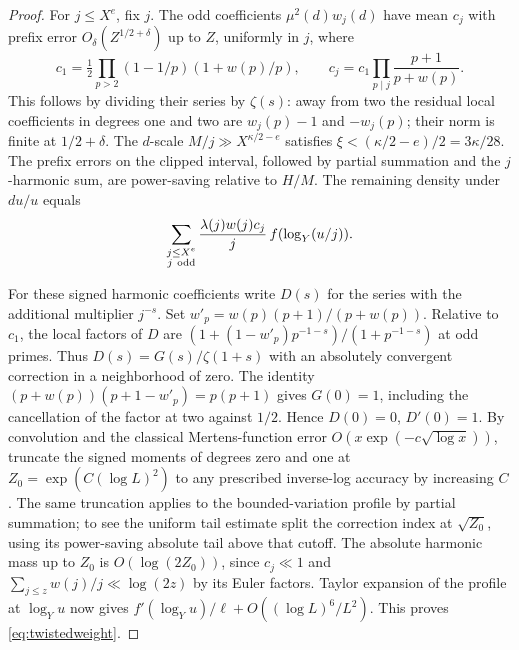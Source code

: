 \documentclass[11pt]{article}
\theoremstyle{remark}\newtheorem{remark}[theorem]{Remark}
\begin{document}
\begin{proof}
For \(j\le X^e\), fix \(j\). The odd coefficients
\(\mu^2(d)w_j(d)\) have mean \(c_j\) with prefix error
\(O_\delta(Z^{1/2+\delta})\) up to \(Z\), uniformly in \(j\), where
\[
 c_1=\tfrac12\prod_{p>2}(1-1/p)(1+w(p)/p),\qquad
 c_j=c_1\prod_{p\mid j}\frac{p+1}{p+w(p)}.
\]
This follows by dividing their series by \(\zeta(s)\):
away from two the residual local coefficients in degrees one and two
are \(w_j(p)-1\) and \(-w_j(p)\); their norm is finite at
\(1/2+\delta\). The \(d\)-scale \(M/j\gg X^{\kappa/2-e}\) satisfies
\(\xi<(\kappa/2-e)/2=3\kappa/28\). The prefix errors on the clipped
interval, followed by partial summation and the \(j\)-harmonic sum, are
power-saving relative to \(H/M\). The remaining density under \(du/u\) equals
\[
 \sum_{\substack{j\le X^e\\ j\ {\rm odd}}}
    \frac{\lambda(j)w(j)c_j}{j}\,f(\log_Y(u/j)).
\]

For these signed harmonic coefficients write \(D(s)\) for the series
with the additional multiplier \(j^{-s}\). Set \(w'_p=w(p)(p+1)/(p+w(p))\).
Relative to \(c_1\), the local factors of \(D\) are
\((1+(1-w'_p)p^{-1-s})/(1+p^{-1-s})\) at odd primes. Thus
\(D(s)=G(s)/\zeta(1+s)\) with an absolutely convergent correction
in a neighborhood of zero. The identity
\((p+w(p))(p+1-w'_p)=p(p+1)\) gives \(G(0)=1\), including the
cancellation of the factor at two against \(1/2\).
Hence \(D(0)=0\), \(D'(0)=1\).
By convolution and the classical Mertens-function error
\(O(x\exp(-c\sqrt{\log x}))\), truncate the signed moments of
degrees zero and one at \(Z_0=\exp(C(\log L)^2)\) to any prescribed
inverse-log accuracy by increasing \(C\). The same truncation applies
to the bounded-variation profile by partial summation; to see the
uniform tail estimate split the correction index at \(\sqrt{Z_0}\),
using its power-saving absolute tail above that cutoff. The absolute
harmonic mass up to \(Z_0\) is \(O(\log(2Z_0))\), since \(c_j\ll1\)
and \(\sum_{j\le z}w(j)/j\ll\log(2z)\) by its Euler factors.
Taylor expansion of the profile at \(\log_Y u\) now gives
\(f'(\log_Y u)/\ell+O((\log L)^6/L^2)\). This proves
\eqref{eq:twistedweight}.
\end{proof}
\end{document}
